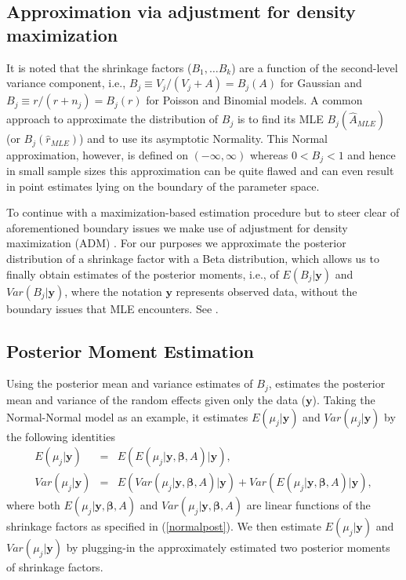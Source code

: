 \documentclass[article]{jss}
\begin{document}
\subsection[ADM]{Approximation via adjustment for density maximization}\label{ADM}
It is noted that the shrinkage factors ($B_1, \ldots B_k$) are a function of the second-level variance component, i.e., $B_{j}\equiv V_{j}/(V_{j}+A)=B_{j}(A)$ for Gaussian and $B_{j}\equiv r/(r+n_{j})=B_{j}(r)$ for Poisson and Binomial models. A common approach to approximate the distribution of $B_{j}$ is to find its MLE $B_{j}(\hat{A}_{MLE})$ (or  $B_{j}(\hat{r}_{MLE})$) and to use its asymptotic Normality. This Normal approximation, however, is defined on $(-\infty, \infty)$ whereas $0 < B_{j} < 1$ and hence in small sample sizes this approximation can be quite flawed and can even result in point estimates lying on the boundary of the parameter space.

To continue with a maximization-based estimation procedure but to steer clear of aforementioned boundary issues we make use of adjustment for density maximization (ADM) \citep{carl1988, 1997, tang2011}. For our purposes we approximate the posterior distribution of a shrinkage factor with a Beta distribution, which allows us to finally obtain estimates of the posterior moments, i.e.,  of $E(B_{j}\vert\boldsymbol{y})$ and $Var(B_{j}\vert\boldsymbol{y})$, where the notation $\boldsymbol{y}$ represents observed data, without the boundary issues that MLE encounters. See \cite{2011}.

\subsection[Posterior moment estimation]{Posterior Moment Estimation}

Using the posterior mean and variance estimates of $B_{j}$,  estimates the posterior mean and variance of the random effects given only the data ($\boldsymbol{y}$). Taking the Normal-Normal model as an example, it estimates $E(\mu_{j}\vert \boldsymbol{y})$ and $Var(\mu_{j}\vert \boldsymbol{y})$ by the following identities
\begin{eqnarray}
E(\mu_{j}\vert \boldsymbol{y}) & = & E(E(\mu_{j}\vert \boldsymbol{y}, \boldsymbol{\beta}, A)\vert \boldsymbol{y}), \\
Var(\mu_{j}\vert \boldsymbol{y}) & = & E(Var(\mu_{j}\vert \boldsymbol{y}, \boldsymbol{\beta}, A)\vert \boldsymbol{y})+Var(E(\mu_{j}\vert \boldsymbol{y}, \boldsymbol{\beta}, A)\vert \boldsymbol{y}),
\end{eqnarray}  
where both $E(\mu_{j}\vert \boldsymbol{y}, \boldsymbol{\beta}, A)$ and $Var(\mu_{j}\vert \boldsymbol{y}, \boldsymbol{\beta}, A)$ are linear functions of the shrinkage factors as specified in (\ref{normalpost}). We then estimate $E(\mu_{j}\vert \boldsymbol{y})$ and $Var(\mu_{j}\vert \boldsymbol{y})$ by plugging-in the approximately estimated two posterior moments of shrinkage factors.
\end{document}
